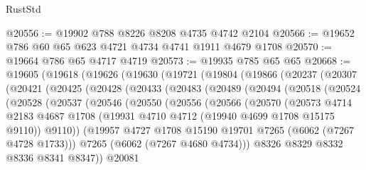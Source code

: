 \begin{lexlean}{RustStd}
\begin{coremodule}
@20556 := @19902 @788 @8226 @8208 @4735 @4742 @2104
@20566 := @19652 @786 @60 @65 @623 @4721 @4734 @4741 @1911 @4679 @1708
@20570 := @19664 @786 @65 @4717 @4719
@20573 := @19935 @785 @65 @65
@20668 := @19605
    (@19618
      (@19626
        (@19630
          (@19721
            (@19804
              (@19866
                (@20237
                  (@20307
                    (@20421
                      (@20425
                        (@20428
                          (@20433
                            (@20483
                              (@20489
                                (@20494
                                  (@20518
                                    (@20524
                                      (@20528
                                        (@20537
                                          (@20546
                                            (@20550
                                              (@20556
                                                (@20566
                                                  (@20570
                                                    (@20573
                                                      @4714
                                                      @2183
                                                      @4687
                                                      @1708
                                                      (@19931
                                                        @4710
                                                        @4712
                                                        (@19940 @4699 @1708 @15175 @9110))
                                                      @9110))
                                                  (@19957
                                                    @4727
                                                    @1708
                                                    @15190
                                                    @19701
                                                    @7265
                                                    (@6062 (@7267 @4728 @1733)))
                                                  @7265
                                                  (@6062 (@7267 @4680 @4734)))
                                                @8326
                                                @8329
                                                @8332
                                                @8336
                                                @8341
                                                @8347))
                                            @20081

\end{coremodule}
\end{lexlean}
